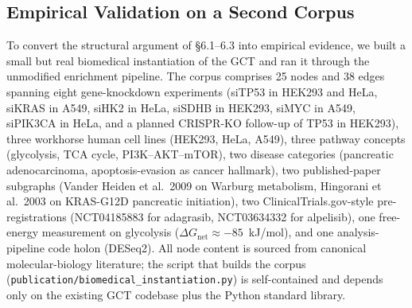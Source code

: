 \documentclass{iosart2x}
\begin{document}
\subsection{Empirical Validation on a Second Corpus}
\label{sec:bio_eval}

To convert the structural argument of \S6.1--6.3 into empirical evidence, we built a small but real biomedical instantiation of the GCT and ran it through the unmodified enrichment pipeline. The corpus comprises 25 nodes and 38 edges spanning eight gene-knockdown experiments (siTP53 in HEK293 and HeLa, siKRAS in A549, siHK2 in HeLa, siSDHB in HEK293, siMYC in A549, siPIK3CA in HeLa, and a planned CRISPR-KO follow-up of TP53 in HEK293), three workhorse human cell lines (HEK293, HeLa, A549), three pathway concepts (glycolysis, TCA cycle, PI3K--AKT--mTOR), two disease categories (pancreatic adenocarcinoma, apoptosis-evasion as cancer hallmark), two published-paper subgraphs (Vander Heiden et al.\ 2009 on Warburg metabolism, Hingorani et al.\ 2003 on KRAS-G12D pancreatic initiation), two ClinicalTrials.gov-style pre-registrations (NCT04185883 for adagrasib, NCT03634332 for alpelisib), one free-energy measurement on glycolysis ($\Delta G_{\text{net}} \approx -85$~kJ/mol), and one analysis-pipeline code holon (DESeq2). All node content is sourced from canonical molecular-biology literature; the script that builds the corpus (\texttt{publication/biomedical\_instantiation.py}) is self-contained and depends only on the existing GCT codebase plus the Python standard library.
\end{document}
